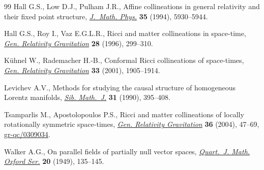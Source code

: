 \documentclass[10pt,a4paper]{amsart}
\numberwithin{equation}{section}
\begin{document}
\begin{thebibliography}{99}
Hall G.S., Low D.J., Pulham J.R., Af\/f\/ine collineations in general relativity
 and their f\/ixed point structure, \href{http://dx.doi.org/10.1063/1.530720}{\textit{J.~Math. Phys.}} \textbf{35} (1994),
 5930--5944.

Hall G.S., Roy I., Vaz E.G.L.R., Ricci and matter collineations in space-time,
 \href{http://dx.doi.org/10.1007/BF02106969}{\textit{Gen. Relativity Gravitation}} \textbf{28} (1996), 299--310.

K{\"u}hnel W., Rademacher H.-B., Conformal {R}icci collineations of space-times,
 \href{http://dx.doi.org/10.1023/A:1013091621037}{\textit{Gen. Relativity Gravitation}} \textbf{33} (2001), 1905--1914.

Levichev A.V., Methods for studying the causal structure of homogeneous
 {L}orentz manifolds, \href{http://dx.doi.org/10.1007/BF00970346}{\textit{Sib. Math.~J.}} \textbf{31} (1990), 395--408.

Tsamparlis M., Apostolopoulos P.S., Ricci and matter collineations of locally
 rotationally symmetric space-times, \href{http://dx.doi.org/10.1023/B:GERG.0000006693.75816.e9}{\textit{Gen. Relativity Gravitation}}
 \textbf{36} (2004), 47--69, \href{http://arxiv.org/abs/gr-qc/0309034}{gr-qc/0309034}.

Walker A.G., On parallel f\/ields of partially null vector spaces,
 \href{http://dx.doi.org/10.1093/qmath/os-20.1.135}{\textit{Quart.~J. Math. Oxford Ser.}} \textbf{20} (1949), 135--145.

\end{thebibliography}
\end{document}
